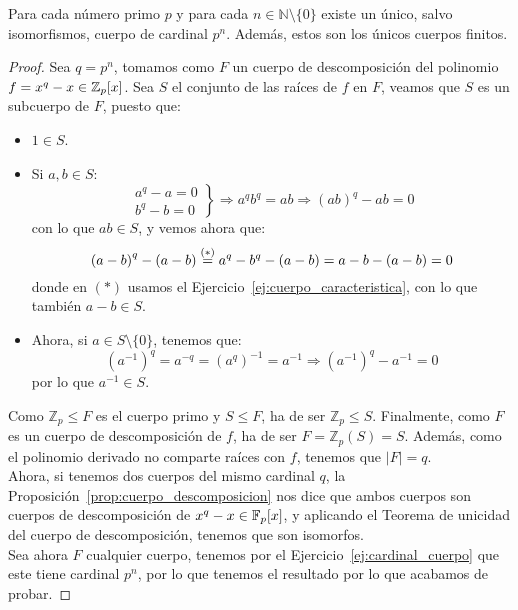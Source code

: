 \begin{teo}
    Para cada número primo $p$ y para cada $n\in \mathbb{N}\setminus\{0\}$ existe un único, salvo isomorfismos, cuerpo de cardinal $p^n$. Además, estos son los únicos cuerpos finitos.
    \begin{proof}
        Sea $q=p^n$, tomamos como $F$ un cuerpo de descomposición del polinomio $f=x^q-x\in \mathbb{Z}_p[x]$. Sea $S$ el conjunto de las raíces de $f$ en $F$, veamos que $S$ es un subcuerpo de $F$, puesto que:
        \begin{itemize}
            \item $1\in S$.
            \item Si $a,b\in S$:
                \begin{equation*}
                    \left.\begin{array}{l}
                        a^q - a = 0 \\
                        b^q - b = 0 
                    \end{array}\right\} \Longrightarrow a^qb^q = ab \Longrightarrow {(ab)}^{q}-ab = 0
                \end{equation*}
                con lo que $ab\in S$, y vemos ahora que:
                \begin{equation*}
                    {(a-b)}^{q}-(a-b) \stackrel{(\ast)}{=} a^q - b^q - (a-b) = a-b-(a-b) = 0
                \end{equation*}
                donde en $(\ast)$ usamos el Ejercicio~\ref{ej:cuerpo_caracteristica}, con lo que también $a-b\in S$.
            \item Ahora, si $a\in S\setminus\{0\}$, tenemos que:
                \begin{equation*}
                    {(a^{-1})}^{q} = a^{-q} = {(a^{q})}^{-1} = a^{-1} \Longrightarrow {(a^{-1})}^{q}-a^{-1} = 0
                \end{equation*}
                por lo que $a^{-1}\in S$.
        \end{itemize}
        Como $\mathbb{Z}_p\leq F$ es el cuerpo primo y $S\leq F$, ha de ser $\mathbb{Z}_p\leq S$. Finalmente, como $F$ es un cuerpo de descomposición de $f$, ha de ser $F=\mathbb{Z}_p(S) =S$. Además, como el polinomio derivado no comparte raíces con $f$, tenemos que $|F| = q$.\\

        \noindent
    Ahora, si tenemos dos cuerpos del mismo cardinal $q$, la Proposición~\ref{prop:cuerpo_descomposicion} nos dice que ambos cuerpos son cuerpos de descomposición de $x^q-x\in \mathbb{F}_p[x]$, y aplicando el Teorema de unicidad del cuerpo de descomposición, tenemos que son isomorfos.\\

    \noindent
    Sea ahora $F$ cualquier cuerpo, tenemos por el Ejercicio~\ref{ej:cardinal_cuerpo} que este tiene cardinal $p^n$, por lo que tenemos el resultado por lo que acabamos de probar.
    \end{proof}
\end{teo}

